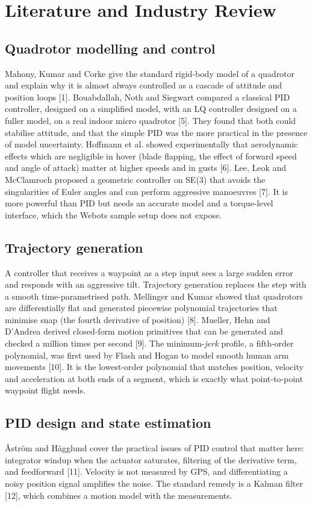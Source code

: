 \section{Literature and Industry Review}
\subsection{Quadrotor modelling and control}
Mahony, Kumar and Corke give the standard rigid-body model of a quadrotor and explain why it is almost always controlled as a cascade of attitude and position loops [1]. Bouabdallah, Noth and Siegwart compared a classical PID controller, designed on a simplified model, with an LQ controller designed on a fuller model, on a real indoor micro quadrotor [5]. They found that both could stabilise attitude, and that the simple PID was the more practical in the presence of model uncertainty. Hoffmann et al. showed experimentally that aerodynamic effects which are negligible in hover (blade flapping, the effect of forward speed and angle of attack) matter at higher speeds and in gusts [6]. Lee, Leok and McClamroch proposed a geometric controller on SE(3) that avoids the singularities of Euler angles and can perform aggressive manoeuvres [7]. It is more powerful than PID but needs an accurate model and a torque-level interface, which the Webots sample setup does not expose.

\subsection{Trajectory generation}
A controller that receives a waypoint as a step input sees a large sudden error and responds with an aggressive tilt. Trajectory generation replaces the step with a smooth time-parametrised path. Mellinger and Kumar showed that quadrotors are differentially flat and generated piecewise polynomial trajectories that minimise snap (the fourth derivative of position) [8]. Mueller, Hehn and D'Andrea derived closed-form motion primitives that can be generated and checked a million times per second [9]. The minimum-\emph{jerk} profile, a fifth-order polynomial, was first used by Flash and Hogan to model smooth human arm movements [10]. It is the lowest-order polynomial that matches position, velocity and acceleration at both ends of a segment, which is exactly what point-to-point waypoint flight needs.

\subsection{PID design and state estimation}
\AA str\"om and H\"agglund cover the practical issues of PID control that matter here: integrator windup when the actuator saturates, filtering of the derivative term, and feedforward [11]. Velocity is not measured by GPS, and differentiating a noisy position signal amplifies the noise. The standard remedy is a Kalman filter [12], which combines a motion model with the measurements.

